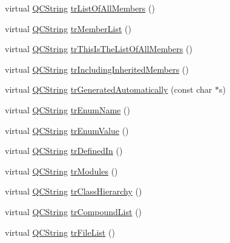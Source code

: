 \begin{DoxyCompactItemize}
\item 
virtual \mbox{\hyperlink{class_q_c_string}{Q\+C\+String}} \mbox{\hyperlink{class_translator_serbian_cyrillic_a3ba4d97ac221e7d170cff784d9bd4e6e}{tr\+List\+Of\+All\+Members}} ()
\item 
virtual \mbox{\hyperlink{class_q_c_string}{Q\+C\+String}} \mbox{\hyperlink{class_translator_serbian_cyrillic_ae6eacfa68ac06191395999cbaaab5170}{tr\+Member\+List}} ()
\item 
virtual \mbox{\hyperlink{class_q_c_string}{Q\+C\+String}} \mbox{\hyperlink{class_translator_serbian_cyrillic_afe29538cfba508afd2c82911588fd3ac}{tr\+This\+Is\+The\+List\+Of\+All\+Members}} ()
\item 
virtual \mbox{\hyperlink{class_q_c_string}{Q\+C\+String}} \mbox{\hyperlink{class_translator_serbian_cyrillic_a0b0286958ced6cb71a504cb69ecac092}{tr\+Including\+Inherited\+Members}} ()
\item 
virtual \mbox{\hyperlink{class_q_c_string}{Q\+C\+String}} \mbox{\hyperlink{class_translator_serbian_cyrillic_a4f58225ab4b28fa0105e4a10a3fdb87c}{tr\+Generated\+Automatically}} (const char $\ast$s)
\item 
virtual \mbox{\hyperlink{class_q_c_string}{Q\+C\+String}} \mbox{\hyperlink{class_translator_serbian_cyrillic_ae0369a7cb3936856cc514c5e065d38b0}{tr\+Enum\+Name}} ()
\item 
virtual \mbox{\hyperlink{class_q_c_string}{Q\+C\+String}} \mbox{\hyperlink{class_translator_serbian_cyrillic_a8937afefdbe2013fac2901276f9c1489}{tr\+Enum\+Value}} ()
\item 
virtual \mbox{\hyperlink{class_q_c_string}{Q\+C\+String}} \mbox{\hyperlink{class_translator_serbian_cyrillic_ad3e4fa04c5b2c93c5198f8edf3f90631}{tr\+Defined\+In}} ()
\item 
virtual \mbox{\hyperlink{class_q_c_string}{Q\+C\+String}} \mbox{\hyperlink{class_translator_serbian_cyrillic_aa9a9fb6c26cce5d53f68fdab99ced23f}{tr\+Modules}} ()
\item 
virtual \mbox{\hyperlink{class_q_c_string}{Q\+C\+String}} \mbox{\hyperlink{class_translator_serbian_cyrillic_a41a8fc911a6a012c86c0f9169adaec74}{tr\+Class\+Hierarchy}} ()
\item 
virtual \mbox{\hyperlink{class_q_c_string}{Q\+C\+String}} \mbox{\hyperlink{class_translator_serbian_cyrillic_a9b7f6f5f1d5cc3cb86d8fb4a8ead21c7}{tr\+Compound\+List}} ()
\item 
virtual \mbox{\hyperlink{class_q_c_string}{Q\+C\+String}} \mbox{\hyperlink{class_translator_serbian_cyrillic_af49c9174bbd066b6b961726cecafdc64}{tr\+File\+List}} ()

\end{DoxyCompactItemize}
